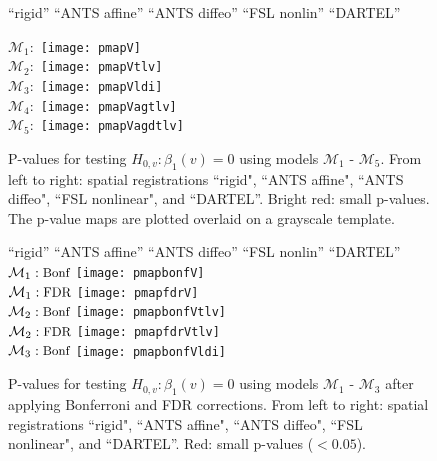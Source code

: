\documentclass[10pt]{article}
\begin{document}
\begin{figure}[ht!]
\begin{center}
 \hspace{0.6in} \small ``rigid''  \hspace{0.4in} \small ``ANTS affine'' \hspace{0.05in} \small ``ANTS diffeo'' \hspace{0.1in}  \small ``FSL nonlin'' \hspace{0.1in} \small ``DARTEL'' \\
\end{center}
$\mathcal{M}_1:$ 
\texttt{[image: pmapV]}  \\
$\mathcal{M}_2:$ 
\texttt{[image: pmapVtlv]}  \\
$\mathcal{M}_3:$ 
\texttt{[image: pmapVldi]}  \\
$\mathcal{M}_4:$ 
\texttt{[image: pmapVagtlv]}  \\
$\mathcal{M}_5:$ 
\texttt{[image: pmapVagdtlv]}  \\
\caption{P-values for testing $H_{0,v}:\beta_1(v)=0$
using models $\mathcal{M}_1$ - $\mathcal{M}_5$. From left to right: spatial
registrations ``rigid", ``ANTS affine", ``ANTS diffeo", ``FSL
nonlinear", and ``DARTEL''. Bright red: small p-values. The p-value maps are plotted
overlaid on a grayscale template.}\label{fig:pval}
\end{figure}

\begin{figure}[ht!]
\begin{center}
 \hspace{0.6in} \small ``rigid''  \hspace{0.4in} \small ``ANTS affine'' \hspace{0.05in} \small ``ANTS diffeo'' \hspace{0.1in}  \small ``FSL nonlin'' \hspace{0.1in} \small ``DARTEL'' \\
$\mathcal{M}_1: \mbox{\small Bonf}$ 
\texttt{[image: pmapbonfV]}  \\
$\mathcal{M}_1: \mbox{\small FDR}$ 
\texttt{[image: pmapfdrV]}  \\
$\mathcal{M}_2: \mbox{\small Bonf}$ 
\texttt{[image: pmapbonfVtlv]}  \\
$\mathcal{M}_2: \mbox{\small FDR}$ 
\texttt{[image: pmapfdrVtlv]}  \\
$\mathcal{M}_3: \mbox{\small Bonf}$ 
\texttt{[image: pmapbonfVldi]}  \\
\end{center}
\caption{P-values for testing $H_{0,v}:\beta_1(v)=0$
using models $\mathcal{M}_1$ - $\mathcal{M}_3$ after applying Bonferroni and FDR corrections. From left to right: spatial registrations ``rigid", ``ANTS affine", ``ANTS diffeo", ``FSL
nonlinear", and ``DARTEL''. Red: small p-values ($<0.05$). }\label{fig:pvalc}
\end{figure}
\end{document}
